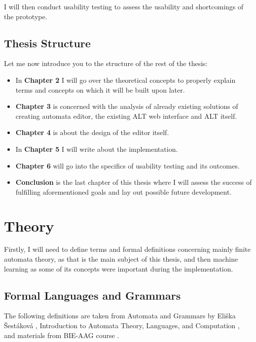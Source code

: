 I will then conduct usability testing to assess the usability and shortcomings of the prototype.

\section{Thesis Structure}

Let me now introduce you to the structure of the rest of the thesis:

\begin{itemize}
\item In \textbf{Chapter 2} I will go over the theoretical concepts to properly explain terms and concepts on which it will be built upon later.

\item \textbf{Chapter 3} is concerned with the analysis of already existing solutions of creating automata editor, the existing ALT web interface and ALT itself.

\item \textbf{Chapter 4} is about the design of the editor itself.

\item In \textbf{Chapter 5} I will write about the implementation.

\item \textbf{Chapter 6} will go into the specifics of usability testing and its outcomes.

\item \textbf{Conclusion} is the last chapter of this thesis where I will assess the success of fulfilling aforementioned goals and lay out possible future development.

\end{itemize}

\chapter{Theory}
\label{chap:theory}

Firstly,  I will need to define terms and formal definitions concerning mainly finite automata theory, as that is the main subject of this thesis, and then machine learning as some of its concepts were important during the implementation. 

\section{Formal Languages and Grammars}
 
The following definitions are taken from Automata and Grammars by Eliška Šestáková \cite{automata-and-grammars}, Introduction to Automata Theory, Languages, and Computation \cite{introduction-automata}, and materials from BIE-AAG course \cite{lectures}.

